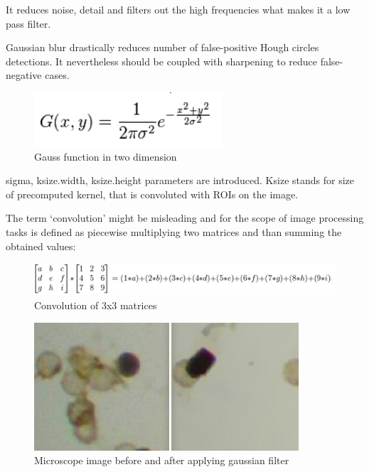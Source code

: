 \documentclass[12pt,twoside,a4paper]{article}
\begin{document}
It reduces noise, detail and filters out the high frequencies what makes it a low pass filter.\cite{cv}

Gaussian blur drastically reduces number of false-positive Hough circles detections. It nevertheless should be coupled with sharpening to reduce false-negative cases.\cite{cnoisy} 


\begin{figure}[H]
\centering
\includegraphics[width=0.4\paperwidth]{gauss}
\caption{Gauss function in two dimension\cite{featproc}}
\end{figure}


sigma, ksize.width, ksize.height  parameters are introduced.
Ksize stands for size of precomputed kernel, that is convoluted with ROIs on the image.

The term ‘convolution’ might be misleading and for the scope of image processing tasks is defined as piecewise multiplying two matrices and than summing the obtained values:

 
\begin{figure}[H]
\centering
\includegraphics[width=0.8\paperwidth]{conv}
\caption{Convolution of 3x3 matrices\cite{gimp}}
\end{figure}

 
\begin{figure}[H]
\centering
\includegraphics[width=0.4\paperwidth]{micro}
\caption{Microscope image before and after applying gaussian filter\cite{cnoisy}}
\end{figure}

  
\end{document}
